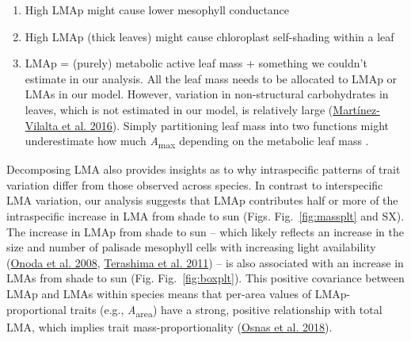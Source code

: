 \documentclass[
  12pt,
]{article}
\providecommand{\tightlist}{%
  \setlength{\itemsep}{0pt}\setlength{\parskip}{0pt}}
\begin{document}
\begin{enumerate}
\def\labelenumi{\arabic{enumi}.}
\tightlist
\item
  High LMAp might cause lower mesophyll conductance
\item
  High LMAp (thick leaves) might cause chloroplast self-shading within a leaf
\item
  LMAp = (purely) metabolic active leaf mass + something we couldn't estimate in our analysis. All the leaf mass needs to be allocated to LMAp or LMAs in our model. However, variation in non-structural carbohydrates in leaves, which is not estimated in our model, is relatively large (\protect\hyperlink{ref-Martinez-Vilalta2016}{Martínez-Vilalta et al. 2016}). Simply partitioning leaf mass into two functions might underestimate how much \emph{A}\textsubscript{max} depending on the metabolic leaf mass .
\end{enumerate}

Decomposing LMA also provides insights as to why intraspecific patterns of trait variation differ from those observed across species.
In contrast to interspecific LMA variation, our analysis suggests that LMAp contributes half or more of the intraspecific increase in LMA from shade to sun (Figs. Fig.~\ref{fig:massplt} and SX).
The increase in LMAp from shade to sun -- which likely reflects an increase in the size and number of palisade mesophyll cells with increasing light availability (\protect\hyperlink{ref-Onoda2008}{Onoda et al. 2008}, \protect\hyperlink{ref-Terashima2011}{Terashima et al. 2011}) -- is also associated with an increase in LMAs from shade to sun (Fig. Fig.~\ref{fig:boxplt}).
This positive covariance between LMAp and LMAs within species means that per-area values of LMAp-proportional traits (e.g., \emph{A}\textsubscript{area}) have a strong, positive relationship with total LMA, which implies trait mass-proportionality (\protect\hyperlink{ref-Osnas2018}{Osnas et al. 2018}).
\end{document}
